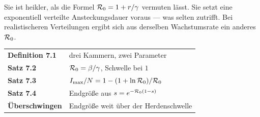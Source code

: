\begin{forschung}
Sie ist heikler, als die Formel $\mathcal{R}_0 = 1 + r/\gamma$ vermuten lässt. Sie setzt eine exponentiell verteilte Ansteckungsdauer voraus --- was selten zutrifft. Bei realistischeren Verteilungen ergibt sich aus derselben Wachstumsrate ein anderes $\mathcal{R}_0$.

\begin{center}
\begin{minipage}{0.88\textwidth}
\end{minipage}
\end{center}
\end{forschung}

\begin{merksatz}
\begin{center}
\renewcommand{\arraystretch}{1.5}
\begin{tabular}{@{}P{3.0cm}P{5.6cm}@{}}
\toprule
\textbf{Definition 7.1} & drei Kammern, zwei Parameter\\
\textbf{Satz 7.2} & $\mathcal{R}_0 = \beta/\gamma$, Schwelle bei $1$\\
\textbf{Satz 7.3} & $I_{\max}/N = 1 - (1+\ln\mathcal{R}_0)/\mathcal{R}_0$\\
\textbf{Satz 7.4} & Endgröße aus $s = e^{-\mathcal{R}_0(1-s)}$\\
\textbf{Überschwingen} & Endgröße weit über der Herdenschwelle\\
\bottomrule
\end{tabular}
\end{center}

\begin{center}
\begin{minipage}{0.88\textwidth}
\end{minipage}
\end{center}
\end{merksatz}
